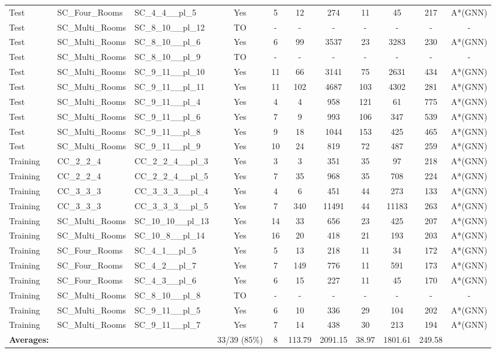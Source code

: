 \documentclass{article}
\begin{document}
\begin{tabular}{lllcccccccc}
Test & SC\_Four\_Rooms & SC\_4\_4\_\_pl\_5 & Yes & 5 & 12 & 274 & 11 & 45 & 217 & A*(GNN) \\
Test & SC\_Multi\_Rooms & SC\_8\_10\_\_pl\_12 & TO & - & - & - & - & - & - & - \\
Test & SC\_Multi\_Rooms & SC\_8\_10\_\_pl\_6 & Yes & 6 & 99 & 3537 & 23 & 3283 & 230 & A*(GNN) \\
Test & SC\_Multi\_Rooms & SC\_8\_10\_\_pl\_9 & TO & - & - & - & - & - & - & - \\
Test & SC\_Multi\_Rooms & SC\_9\_11\_\_pl\_10 & Yes & 11 & 66 & 3141 & 75 & 2631 & 434 & A*(GNN) \\
Test & SC\_Multi\_Rooms & SC\_9\_11\_\_pl\_11 & Yes & 11 & 102 & 4687 & 103 & 4302 & 281 & A*(GNN) \\
Test & SC\_Multi\_Rooms & SC\_9\_11\_\_pl\_4 & Yes & 4 & 4 & 958 & 121 & 61 & 775 & A*(GNN) \\
Test & SC\_Multi\_Rooms & SC\_9\_11\_\_pl\_6 & Yes & 7 & 9 & 993 & 106 & 347 & 539 & A*(GNN) \\
Test & SC\_Multi\_Rooms & SC\_9\_11\_\_pl\_8 & Yes & 9 & 18 & 1044 & 153 & 425 & 465 & A*(GNN) \\
Test & SC\_Multi\_Rooms & SC\_9\_11\_\_pl\_9 & Yes & 10 & 24 & 819 & 72 & 487 & 259 & A*(GNN) \\
Training & CC\_2\_2\_4 & CC\_2\_2\_4\_\_pl\_3 & Yes & 3 & 3 & 351 & 35 & 97 & 218 & A*(GNN) \\
Training & CC\_2\_2\_4 & CC\_2\_2\_4\_\_pl\_5 & Yes & 7 & 35 & 968 & 35 & 708 & 224 & A*(GNN) \\
Training & CC\_3\_3\_3 & CC\_3\_3\_3\_\_pl\_4 & Yes & 4 & 6 & 451 & 44 & 273 & 133 & A*(GNN) \\
Training & CC\_3\_3\_3 & CC\_3\_3\_3\_\_pl\_5 & Yes & 7 & 340 & 11491 & 44 & 11183 & 263 & A*(GNN) \\
Training & SC\_Multi\_Rooms & SC\_10\_10\_\_pl\_13 & Yes & 14 & 33 & 656 & 23 & 425 & 207 & A*(GNN) \\
Training & SC\_Multi\_Rooms & SC\_10\_8\_\_pl\_14 & Yes & 16 & 20 & 418 & 21 & 193 & 203 & A*(GNN) \\
Training & SC\_Four\_Rooms & SC\_4\_1\_\_pl\_5 & Yes & 5 & 13 & 218 & 11 & 34 & 172 & A*(GNN) \\
Training & SC\_Four\_Rooms & SC\_4\_2\_\_pl\_7 & Yes & 7 & 149 & 776 & 11 & 591 & 173 & A*(GNN) \\
Training & SC\_Four\_Rooms & SC\_4\_3\_\_pl\_6 & Yes & 6 & 15 & 227 & 11 & 45 & 170 & A*(GNN) \\
Training & SC\_Multi\_Rooms & SC\_8\_10\_\_pl\_8 & TO & - & - & - & - & - & - & - \\
Training & SC\_Multi\_Rooms & SC\_9\_11\_\_pl\_5 & Yes & 6 & 10 & 336 & 29 & 104 & 202 & A*(GNN) \\
Training & SC\_Multi\_Rooms & SC\_9\_11\_\_pl\_7 & Yes & 7 & 14 & 438 & 30 & 213 & 194 & A*(GNN) \\
\textbf{Averages:} & & & 33/39 (85\%) & 8 & 113.79 & 2091.15 & 38.97 & 1801.61 & 249.58 & \\
\bottomrule
\end{tabular}
\newpage
\end{document}
